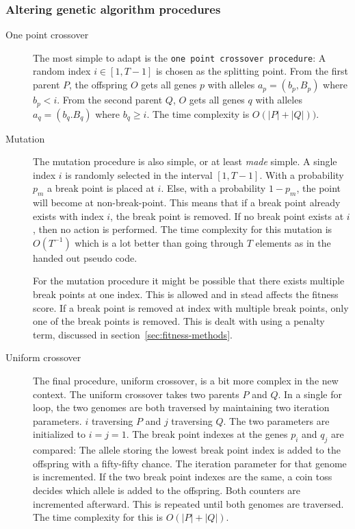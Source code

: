 \subsubsection{Altering genetic algorithm procedures}
\label{sec:altering-procedures}

\begin{description}
    \item[One point crossover] The most simple to adapt is the \texttt{one point
    crossover procedure}: A random index $i \in [1, T-1]$ is chosen as the
    splitting point. From the first parent $P$, the offspring $O$ gets all genes
    $p$ with alleles $a_p = (b_p, B_p)$ where $b_p < i$. From the second parent
    $Q$, $O$ gets all genes $q$ with alleles $a_q = (b_q. B_q)$ where $b_q \geq
    i$. The time complexity is $O(|P| + |Q|))$.
    
    
    \item [Mutation] The mutation procedure is also simple, or at least
    \textit{made} simple. A single index $i$ is randomly selected in the
    interval $[1, T - 1]$. With a probability $p_m$ a break point is placed at
    $i$. Else, with a probability $1 - p_m$, the point will become at
    non-break-point. This means that if a break point already exists with index
    $i$, the break point is removed. If no break point exists at $i$, then no
    action is performed. The time complexity for this mutation is $O(T^{-1})$
    which is a lot better than going through $T$ elements as in the handed out
    pseudo code. 
    
    For the mutation procedure it might be possible that there exists multiple
    break points at one index. This is allowed and in stead affects the fitness
    score. If a break point is removed at index with multiple break points, only
    one of the break points is removed. This is dealt with using a penalty term,
    discussed in section~\ref{sec:fitness-methods}.

    \item [Uniform crossover] The final procedure, uniform crossover, is a bit
    more complex in the new context. The uniform crossover takes two parents $P$
    and $Q$. In a single for loop, the two genomes are both traversed by
    maintaining two iteration parameters. $i$ traversing $P$ and $j$ traversing
    $Q$. The two parameters are initialized to $i = j = 1$. The break point
    indexes at the genes $p_i$ and $q_j$ are compared: The allele storing the
    lowest break point index is added to the offspring with a fifty-fifty
    chance. The iteration parameter for that genome is incremented. If the two
    break point indexes are the same, a coin toss decides which allele is added
    to the offspring. Both counters are incremented afterward. This is repeated
    until both genomes are traversed. The time complexity for this is $O(|P|
    + |Q|)$. 
    

\end{description}
